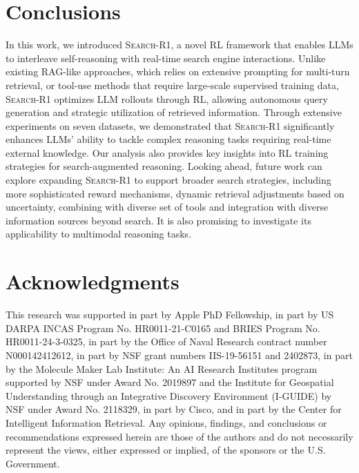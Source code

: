 \documentclass{article} %
\newcommand{\Ours}{\textsc{Search-R1}\xspace}
\begin{document}
\section{Conclusions}
In this work, we introduced \Ours, a novel RL framework that enables LLMs to interleave self-reasoning with real-time search engine interactions. 
Unlike existing RAG-like approaches, which relies on extensive prompting for multi-turn retrieval, or tool-use methods that require large-scale supervised training data, \Ours optimizes LLM rollouts through RL, allowing autonomous query generation and strategic utilization of retrieved information.
Through extensive experiments on seven datasets, we demonstrated that \Ours significantly enhances LLMs' ability to tackle complex reasoning tasks requiring real-time external knowledge. 
Our analysis also provides key insights into RL training strategies for search-augmented reasoning.
Looking ahead, future work can explore expanding \Ours to support broader search strategies, including more sophisticated reward mechanisms, dynamic retrieval adjustments based on uncertainty, combining with diverse set of tools and integration with diverse information sources beyond search. 
It is also promising to investigate its applicability to multimodal reasoning tasks.



\section*{Acknowledgments}
This research was supported in part by Apple PhD Fellowship, in part by US DARPA INCAS Program No. HR0011-21-C0165 and BRIES Program No. HR0011-24-3-0325, in part by the Office of Naval Research contract number N000142412612, in part by NSF grant numbers IIS-19-56151 and 2402873, in part by the Molecule Maker Lab Institute: An AI Research Institutes program supported by NSF under Award No. 2019897 and the Institute for Geospatial Understanding through an Integrative Discovery Environment (I-GUIDE) by NSF under Award No. 2118329, in part by Cisco, and in part by the Center for Intelligent Information Retrieval. Any opinions, findings, and conclusions or recommendations expressed herein are those of the authors and do not necessarily represent the views, either expressed or implied, of the sponsors or the U.S. Government.
\end{document}
